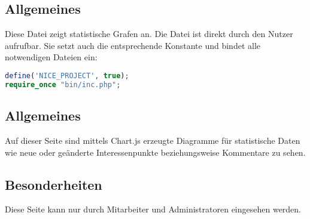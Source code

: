 \subsection{Allgemeines} Diese Datei zeigt statistische Grafen an.
Die Datei ist direkt durch den Nutzer aufrufbar. Sie setzt auch die entsprechende Konstante und bindet alle notwendigen Dateien ein:
\begin{lstlisting}[language=php]
define('NICE_PROJECT', true);
require_once "bin/inc.php";
\end{lstlisting}
\subsection{Allgemeines}
Auf dieser Seite sind mittels {\glqq Chart.js\grqq} erzeugte Diagramme für statistische Daten wie neue oder geänderte Interessenpunkte beziehungsweise Kommentare zu sehen.
\subsection{Besonderheiten}
Diese Seite kann nur durch Mitarbeiter und Administratoren eingesehen werden.